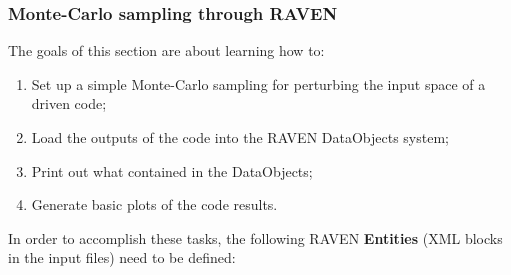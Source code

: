 \subsubsection{Monte-Carlo sampling through RAVEN}
\label{subsub:MCexample}
The goals of this section are about learning how to:
 \begin{enumerate}
   \item Set up a simple Monte-Carlo sampling for perturbing the input space of a driven code;
   \item Load the outputs of the code into the RAVEN DataObjects system;
   \item Print out what contained in the DataObjects;
   \item Generate basic plots of the code results.
\end{enumerate}  
In order to accomplish these tasks, the following RAVEN \textbf{Entities} (XML blocks in the input files) need to be defined:
